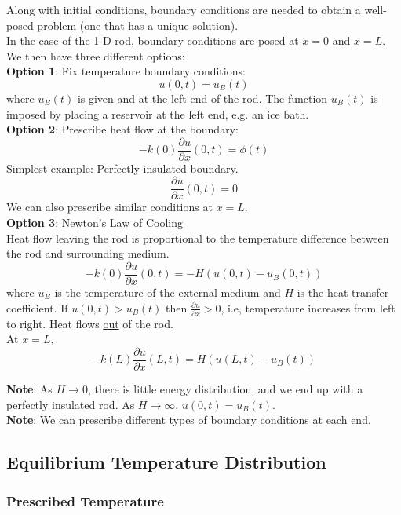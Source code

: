 \documentclass{article}
\begin{document}
	Along with initial conditions, boundary conditions are needed to obtain a well-posed problem (one that has a unique solution). \\
	
	In the case of the 1-D rod, boundary conditions are posed at $ x=0 $ and $ x=L $. We then have three different options: \\
	
	\textbf{Option 1}: Fix temperature boundary conditions:
	\[
		u(0,t) = u_B(t)
	\]
	where $ u_B(t) $ is given and at the left end of the rod. The function $ u_B(t) $ is imposed by placing a reservoir at the left end, e.g. an ice bath. \\
	
	\textbf{Option 2}: Prescribe heat flow at the boundary:
	\[
		-k(0) \frac{\partial u}{\partial x}(0,t) = \phi(t)
	\]
	Simplest example: Perfectly insulated boundary.
	\[
		\frac{\partial u}{\partial x}(0,t) = 0
	\]
	We can also prescribe similar conditions at $ x=L $. \\
	
	\textbf{Option 3}: Newton's Law of Cooling \\
	
	Heat flow leaving the rod is proportional to the temperature difference between the rod and surrounding medium.
	\[
		-k(0) \frac{\partial u}{\partial x}(0,t) = -H(u(0,t) - u_B(0,t))
	\]
	where $ u_B $ is the temperature of the external medium and $ H $ is the heat transfer coefficient. If $ u(0,t) > u_B(t) $ then $ \frac{\partial u}{\partial x} > 0 $, i.e, temperature increases from left to right. Heat flows \underline{out} of the rod. \\
	
	At $ x=L $,
	\[
		-k(L) \frac{\partial u}{\partial x}(L,t) = H(u(L,t) - u_B(t))
	\]
	
	\textbf{Note}: As $ H \to 0 $, there is little energy distribution, and we end up with a perfectly insulated rod. As $ H \to \infty $, $ u(0,t) = u_B(t) $. \\
	
	\textbf{Note}: We can prescribe different types of boundary conditions at each end.
	
	\subsection{Equilibrium Temperature Distribution}
	
	\subsubsection{Prescribed Temperature}
	
\end{document}
